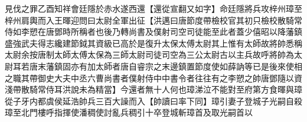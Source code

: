 見伐之罪乙酉知祥會廷隱於赤水遂西還【還從宣翻又如字】命廷隱將兵攻梓州璋至梓州肩輿而入王暉迎問曰太尉全軍出征【洪邁曰唐節度帶檢校官其初只檢校散騎常侍如李愬在唐鄧時所稱者也後乃轉尚書及僕射司空司徒能至此者蓋少僖昭以降藩鎮盛強武夫得志纔建節鉞其資級已高於是復升太保太傅太尉其上惟有太師故將帥悉稱太尉余按唐制太師太傅太保為三師太尉司徒司空為三公太尉古以主兵故呼將帥為太尉耳若唐末藩鎮固亦有加太師者唐自睿宗之末邊鎮置節度使如薛訥等已是後來使相之職其帶御史大夫中丞六曹尚書者僕射侍中中書令者往往有之李愬之帥唐鄧隨以資淺帶散騎常侍耳洪說未為精當】今還者無十人何也璋涕泣不能對至府第方食暉與璋從子牙内都虞侯延浩帥兵三百大譟而入【帥讀曰率下同】璋引妻子登城子光嗣自殺璋至北門樓呼指揮使潘稠使討亂兵稠引十卒登城斬璋首及取光嗣首以